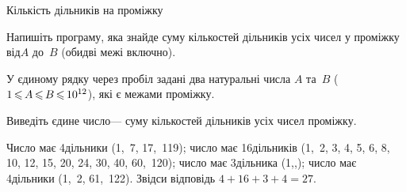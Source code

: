 \begin{problemAllDefault}{Кількість дільників на проміжку}

Напишіть програму, яка знайде суму кількостей дільників усіх чисел у проміжку від\nolinebreak[2] $A$ до~$B$ (обидві межі включно).

\InputFile У єдиному рядку через пробіл задані два натуральні числа $A$ та~$B$ ($1\,{\leqslant}\,A\,{\leqslant}\,B\,{\leqslant}\,10^{12}$), які 
є межами
проміжку.

\myflfigaw{\hspace*{-0.5em}\begin{exampleSimple}{3.5em}{3em}%

\end{exampleSimple}\hspace*{-0.25em}}

\OutputFile Виведіть єдине число\nolinebreak[3] --- суму кількостей дільників усіх чисел проміжку.

\Note
Число має 4\nolinebreak[3] дільники (1,~7, 17,~119);
число має 16\nolinebreak[3] дільників (1,~2, 3, 4, 5, 6, 8, 10, 12, 15, 20, 24, 30, 40, 60,~120);
число має 3\nolinebreak[3] дільника (1,,);
число має 4\nolinebreak[3] дільники (1,~2, 61,~122).
Звідси відповідь \mbox{$4{+}16{+}3{+}4 = 27$}.

\end{problemAllDefault}

